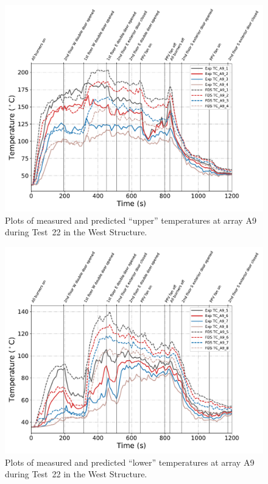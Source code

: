 \begin{figure}[!h]
	\centering
	\includegraphics[width=\columnwidth]{Figures/Plots/Validation/Temperature/Test_22_TC_A9_upper}
	\caption{Plots of measured and predicted ``upper'' temperatures at array A9 during Test~22 in the West Structure.}
	\label{fig:TCA9_upper_data_Test22}
\end{figure}

\begin{figure}[!h]
	\centering
	\includegraphics[width=\columnwidth]{Figures/Plots/Validation/Temperature/Test_22_TC_A9_lower}
	\caption{Plots of measured and predicted ``lower'' temperatures at array A9 during Test~22 in the West Structure.}
	\label{fig:TCA9_lower_data_Test22}
\end{figure}


